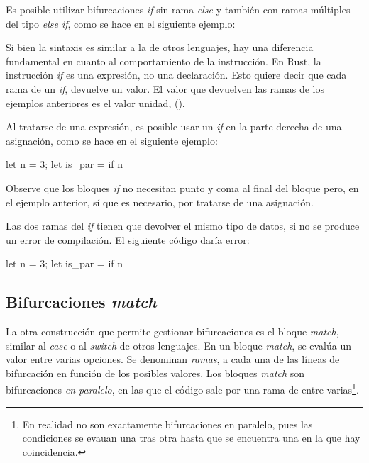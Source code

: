 Es posible utilizar bifurcaciones \textit{if} sin rama \textit{else} y también con ramas múltiples del tipo \textit{else if}, como se hace en el siguiente ejemplo:

\vspace{0.7em}

Si bien la sintaxis es similar a la de otros lenguajes, hay una diferencia fundamental en cuanto al comportamiento de la instrucción. En Rust, la instrucción \textit{if} es una expresión, no una declaración. Esto quiere decir que cada rama de un \textit{if}, devuelve un valor. El valor que devuelven las ramas de los ejemplos anteriores es el valor unidad, (). 

Al tratarse de una expresión, es posible usar un \textit{if} en la parte derecha de una asignación, como se hace en el siguiente ejemplo:

\vspace{0.7em}
\begin{Codigo}
let n = 3;
let is_par = if n%
\end{Codigo}

Observe que los bloques \textit{if} no necesitan punto y coma al final del bloque pero, en el ejemplo anterior, sí que es necesario, por tratarse de una  asignación.

Las dos ramas del \textit{if} tienen que devolver el mismo tipo de datos, si no se produce un error de compilación. El siguiente código daría error:

\vspace{0.7em}
\begin{Codigo}
let n = 3;
let is_par = if n%
\end{Codigo}

\subsection{Bifurcaciones \textit{match}}
\label{sec_match}
\noindent La otra construcción que permite gestionar bifurcaciones es el bloque \textit{match}, similar al \textit{case} o al \textit{switch} de otros lenguajes. En un bloque \textit{match}, se evalúa un valor entre varias opciones. Se denominan \textit{ramas}, a cada una de las líneas de bifurcación en función de los posibles valores. Los bloques \textit{match} son bifurcaciones \textit{en paralelo}, en las que el código sale por una rama de entre varias\footnote{En realidad no son exactamente bifurcaciones en paralelo, pues las condiciones se evauan una tras otra hasta que se encuentra una en la que hay coincidencia.}.


